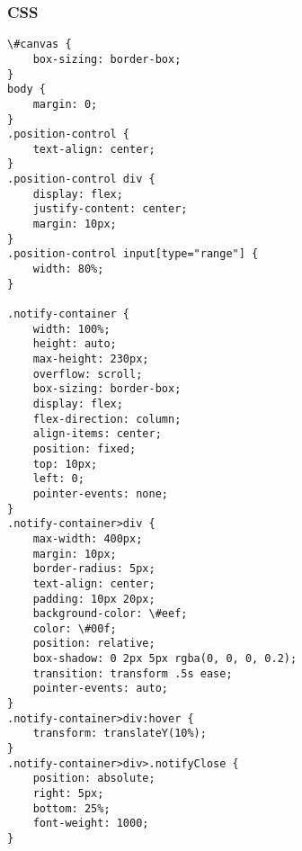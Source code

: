 \subsubsection*{CSS}
\begin{lstlisting}[style=htmlcssjs]
\#canvas {
    box-sizing: border-box;
}
body {
    margin: 0;
}
.position-control {
    text-align: center;
}
.position-control div {
    display: flex;
    justify-content: center;
    margin: 10px;
}
.position-control input[type="range"] {
    width: 80%;
}

.notify-container {
    width: 100%;
    height: auto;
    max-height: 230px;
    overflow: scroll;
    box-sizing: border-box;
    display: flex;
    flex-direction: column;
    align-items: center;
    position: fixed;
    top: 10px;
    left: 0;
    pointer-events: none;
}
.notify-container>div {
    max-width: 400px;
    margin: 10px;
    border-radius: 5px;
    text-align: center;
    padding: 10px 20px;
    background-color: \#eef;
    color: \#00f;
    position: relative;
    box-shadow: 0 2px 5px rgba(0, 0, 0, 0.2);
    transition: transform .5s ease;
    pointer-events: auto;
}
.notify-container>div:hover {
    transform: translateY(10%);
}
.notify-container>div>.notifyClose {
    position: absolute;
    right: 5px;
    bottom: 25%;
    font-weight: 1000;
}
\end{lstlisting}




